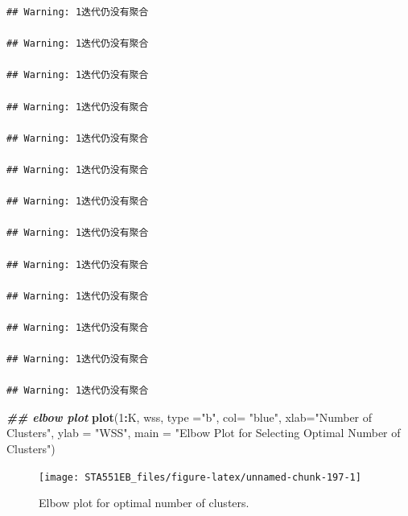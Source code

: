 \documentclass[
]{book}
\newenvironment{Shaded}{\begin{snugshade}}{\end{snugshade}}
\newcommand{\AttributeTok}[1]{\textcolor[rgb]{0.13,0.29,0.53}{#1}}
\newcommand{\ConstantTok}[1]{\textcolor[rgb]{0.56,0.35,0.01}{#1}}
\newcommand{\ControlFlowTok}[1]{\textcolor[rgb]{0.13,0.29,0.53}{\textbf{#1}}}
\newcommand{\DecValTok}[1]{\textcolor[rgb]{0.00,0.00,0.81}{#1}}
\newcommand{\DocumentationTok}[1]{\textcolor[rgb]{0.56,0.35,0.01}{\textbf{\textit{#1}}}}
\newcommand{\FunctionTok}[1]{\textcolor[rgb]{0.13,0.29,0.53}{\textbf{#1}}}
\newcommand{\NormalTok}[1]{#1}
\newcommand{\OtherTok}[1]{\textcolor[rgb]{0.56,0.35,0.01}{#1}}
\newcommand{\SpecialCharTok}[1]{\textcolor[rgb]{0.81,0.36,0.00}{\textbf{#1}}}
\newcommand{\StringTok}[1]{\textcolor[rgb]{0.31,0.60,0.02}{#1}}
\begin{document}
\begin{Shaded}
\end{Shaded}

\begin{verbatim}
## Warning: 1迭代仍没有聚合

## Warning: 1迭代仍没有聚合

## Warning: 1迭代仍没有聚合

## Warning: 1迭代仍没有聚合

## Warning: 1迭代仍没有聚合

## Warning: 1迭代仍没有聚合

## Warning: 1迭代仍没有聚合

## Warning: 1迭代仍没有聚合

## Warning: 1迭代仍没有聚合

## Warning: 1迭代仍没有聚合

## Warning: 1迭代仍没有聚合

## Warning: 1迭代仍没有聚合

## Warning: 1迭代仍没有聚合
\end{verbatim}

\begin{Shaded}
\begin{Highlighting}[]
\DocumentationTok{\#\# elbow plot}
\FunctionTok{plot}\NormalTok{(}\DecValTok{1}\SpecialCharTok{:}\NormalTok{K, wss, }\AttributeTok{type =}\StringTok{"b"}\NormalTok{,}
          \AttributeTok{col=} \StringTok{"blue"}\NormalTok{,}
          \AttributeTok{xlab=}\StringTok{"Number of Clusters"}\NormalTok{,}
          \AttributeTok{ylab =} \StringTok{"WSS"}\NormalTok{,}
          \AttributeTok{main =} \StringTok{"Elbow Plot for Selecting Optimal Number of Clusters"}\NormalTok{)}
\end{Highlighting}
\end{Shaded}

\begin{figure}

{\centering \texttt{[image: STA551EB\_files/figure-latex/unnamed-chunk-197-1]} 

}

\caption{Elbow plot for optimal number of clusters.}\label{fig:unnamed-chunk-197}
\end{figure}
\end{document}
